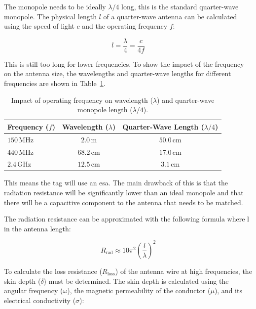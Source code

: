 The monopole needs to be ideally $\lambda/4$ long, this is the standard quarter-wave monopole. The physical length $l$ of a quarter-wave antenna can be calculated using the speed of light $c$ and the operating frequency $f$:

\begin{equation}
	l = \frac{\lambda}{4} = \frac{c}{4f}
\end{equation}

This is still too long for lower frequencies. To show the impact of the frequency on the antenna size, the wavelengths and quarter-wave lengths for different frequencies are shown in Table~\ref{tab:antenna_dimensions}.

\begin{table}[htbp]
	\centering
	\caption{Impact of operating frequency on wavelength ($\lambda$) and quarter-wave monopole length ($\lambda/4$).}
	\label{tab:antenna_dimensions}
	\begin{tabular}{l c c}
		\toprule
		\textbf{Frequency ($f$)} & \textbf{Wavelength ($\lambda$)} & \textbf{Quarter-Wave Length ($\lambda/4$)} \\
		\midrule
		$150\,\text{MHz}$ & $2.0\,\text{m}$ & $50.0\,\text{cm}$ \\
		$440\,\text{MHz}$ & $68.2\,\text{cm}$ & $17.0\,\text{cm}$ \\
		$2.4\,\text{GHz}$ & $12.5\,\text{cm}$ & $3.1\,\text{cm}$ \\
		\bottomrule
	\end{tabular}
\end{table}

This means the tag will use an \gls{esa}. The main drawback of this is that the radiation resistance will be significantly lower than an ideal monopole and that there will be a capacitive component to the antenna that needs to be matched. 

The radiation resistance can be approximated with the following formula where l in the antenna length:

\begin{equation}
	R_{\text{rad}} \approx 10\pi^2 \left(\frac{l}{\lambda}\right)^2
\end{equation}

To calculate the loss resistance ($R_{\text{loss}}$) of the antenna wire at high frequencies, the skin depth ($\delta$) must be determined. The skin depth is calculated using the angular frequency ($\omega$), the magnetic permeability of the conductor ($\mu$), and its electrical conductivity ($\sigma$):

